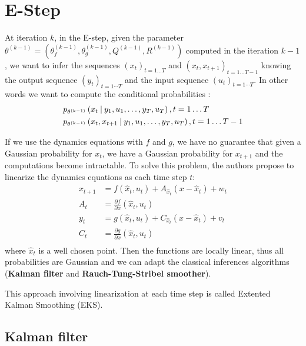 \section{E-Step}

At iteration $k$, in the E-step, given the parameter $\theta^{(k-1)} = \left( \theta_f^{(k-1)}, \theta_g^{(k-1)}, Q^{(k-1)}, R^{(k-1)} \right)$ computed in the iteration $k-1$, we want to infer the sequences $(x_t)_{t=1 \ldots T}$ and $(x_t, x_{t+1})_{t=1 \ldots T-1}$ knowing the output sequence $(y_t)_{t=1 \cdots T}$ and the input sequence $(u_t)_{t=1 \cdots T}$.
In other words we want to compute the conditional probabilities :
\begin{align*}
  &p_{\theta^{(k-1)}}\left(x_t \mathbin{\vert} y_1, u_1, \ldots, y_T, u_T \right), t=1 \ldots T\\
  &p_{\theta^{(k-1)}}\left(x_t, x_{t+1} \mathbin{\vert} y_1, u_1, \ldots, y_T, u_T \right), t=1 \ldots T-1\\
\end{align*}

If we use the dynamics equations with $f$ and $g$, we have no guarantee that given a Gaussian probability for $x_t$, we have a Gaussian probability for $x_{t+1}$ and the computations become intractable.
To solve this problem, the authors propose to linearize the dynamics equations as each time step $t$:
\begin{align*}
  x_{t+1} &= f(\hat{x}_t, u_t) + A_{\hat{x}_t} (x - \hat{x}_t) + w_t\\
  A_t &= \frac{\partial f}{\partial x}(\hat{x}_t, u_t)\\
  y_t &= g(\hat{x}_t, u_t) + C_{\hat{x}_t} (x - \hat{x}_t) + v_t\\
  C_t &= \frac{\partial g}{\partial x}(\hat{x}_t, u_t)\\
\end{align*}
where $\hat{x}_t$ is a well chosen point.
Then the functions are locally linear, thus all probabilities are Gaussian and we can adapt the classical inferences algorithms (\textbf{Kalman filter} and \textbf{Rauch-Tung-Stribel smoother}).

This approach involving linearization at each time step is called Extented Kalman Smoothing (EKS).

\subsection{Kalman filter}

